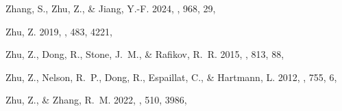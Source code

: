 \documentclass[twocolumn,tighten]{aastex631}
\begin{document}
\begin{thebibliography}{}
{Zhang}, S., {Zhu}, Z., \& {Jiang}, Y.-F. 2024, \apj, 968, 29, 

{Zhu}, Z. 2019, \mnras, 483, 4221, 

{Zhu}, Z., {Dong}, R., {Stone}, J.~M., \& {Rafikov}, R.~R. 2015, \apj, 813, 88, 

{Zhu}, Z., {Nelson}, R.~P., {Dong}, R., {Espaillat}, C., \& {Hartmann}, L. 2012, \apj, 755, 6, 

{Zhu}, Z., \& {Zhang}, R.~M. 2022, \mnras, 510, 3986, 

\end{thebibliography}
\end{document}
